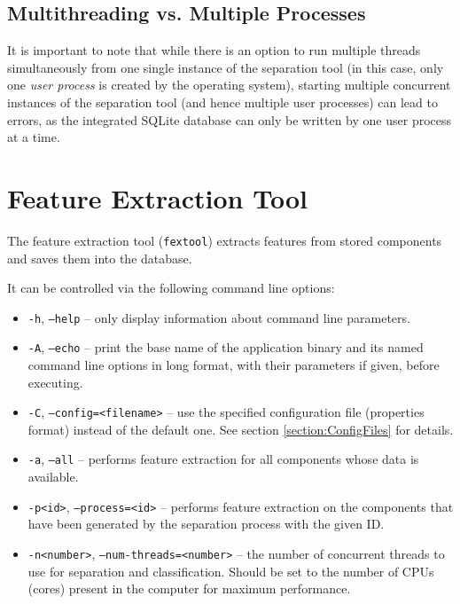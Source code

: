 \subsection{Multithreading vs. Multiple Processes}
\label{section:MultithreadingMultiprocessing}

\begin{leftbar}
  It is important to note that while there is an option to run multiple threads
  simultaneously from one single instance of the separation tool (in this case,
  only one \emph{user process} is created by the operating system), starting
  multiple concurrent instances of the separation tool (and hence multiple user
  processes) can lead to errors, as the integrated SQLite database can
  only be written by one user process at a time.
\end{leftbar}


\section{Feature Extraction Tool}
\label{section:fextool}

The feature extraction tool (\verb!fextool!) extracts features from stored
components and saves them into the database.

\noindent It can be controlled via the following command line options:
\begin{itemize}
  \item {\tt -h}, {\tt --help} -- only display information about command line
    parameters.
  \item {\tt -A}, {\tt --echo} -- print the base name of the application binary
    and its named command line options in long format, with their parameters if 
    given, before executing.
  \item {\tt -C}, {\tt --config=<filename>} -- use the specified configuration
    file (properties format) instead of the default one. See section 
    \ref{section:ConfigFiles} for details.
  \item {\tt -a}, {\tt --all} -- performs feature extraction for all
    components whose data is available.
  \item {\tt -p<id>}, {\tt --process=<id>} -- performs feature extraction on
    the components that have been generated by the separation process with the
    given ID.
  \item {\tt -n<number>}, {\tt --num-threads=<number>} -- the number of
    concurrent threads to use for separation and classification. Should be set
    to the number of CPUs (cores) present in the computer for maximum
    performance.
\end{itemize}

